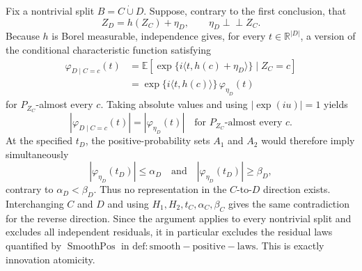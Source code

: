 Fix a nontrivial split \(B=C\mathbin{\dot\cup}D\).  Suppose, contrary to the first conclusion, that
\[
 Z_D=h(Z_C)+\eta_D,
 \qquad \eta_D\perp\!\!\!\perp Z_C.
\]
Because \(h\) is Borel measurable, independence gives, for every \(t\in\mathbb R^{|D|}\), a version of the conditional characteristic function satisfying
\[
 \begin{aligned}
 \varphi_{D\mid C=c}(t)
 &=\mathbb E\!\left[\exp\{i\langle t,h(c)+\eta_D\rangle\}\mid Z_C=c\right]\\
 &=\exp\{i\langle t,h(c)\rangle\}\,\varphi_{\eta_D}(t)
 \end{aligned}
\]
for \(P_{Z_C}\)-almost every \(c\).  Taking absolute values and using \(|\exp(iu)|=1\) yields
\[
 |\varphi_{D\mid C=c}(t)|=|\varphi_{\eta_D}(t)|
 \quad\text{for }P_{Z_C}\text{-almost every }c.
\]
At the specified \(t_D\), the positive-probability sets \(A_1\) and \(A_2\) would therefore imply simultaneously
\[
 |\varphi_{\eta_D}(t_D)|\leq\alpha_D
 \quad\text{and}\quad
 |\varphi_{\eta_D}(t_D)|\geq\beta_D,
\]
contrary to \(\alpha_D<\beta_D\).  Thus no representation in the \(C\)-to-\(D\) direction exists.  Interchanging \(C\) and \(D\) and using \(H_1,H_2,t_C,\alpha_C,\beta_C\) gives the same contradiction for the reverse direction.  Since the argument applies to every nontrivial split and excludes all independent residuals, it in particular excludes the residual laws quantified by \(\operatorname{SmoothPos}\) in \(\mathrm{def:smooth-positive-laws}\).  This is exactly innovation atomicity.